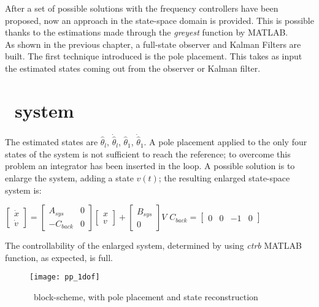 
After a set of possible solutions with the frequency controllers have been proposed, now an approach in the state-space domain is provided. This is possible thanks to the estimations made through the \textit{greyest} function by MATLAB.\\
As shown in the previous chapter, a full-state observer and Kalman Filters are built. The first technique introduced is the pole placement. This takes as input the estimated states coming out from the observer or Kalman filter.

\section{\onedof\ system}
The estimated states are $\hat\theta_l$, $\dot{\hat\theta}_l$, $\hat\theta_1$, $\dot{\hat\theta}_1$. 
A pole placement applied to the only four states of the system is not sufficient to reach the reference; to overcome this problem an integrator has been inserted in the loop. A possible solution is to enlarge the system, adding a state $v(t)$; the resulting enlarged state-space system is:
\begin{center}
	$\begin{bmatrix}
		\dot{x} \\
		\dot{v}
	\end{bmatrix}
	=
	\begin{bmatrix}
		A_{sys} & 0 \\
		-C_{back} & 0
	\end{bmatrix}
	\begin{bmatrix}
		x \\
		v
	\end{bmatrix}
	+
	\begin{bmatrix}
		B_{sys} \\
		0
	\end{bmatrix}
	V$		\qquad $ C_{back} =
	\begin{bmatrix}
		0 & 0 & -1 & 0
	\end{bmatrix}$
\end{center}

The controllability of the enlarged system, determined by using \textit{ctrb} MATLAB function, as expected, is full.
\begin{figure*}[h]
	\centering
	\texttt{[image: pp\_1dof]}
	\caption{\onedof\ block-scheme, with pole placement and state reconstruction}
	\label{fig:1_dof block scheme pp + obs}
\end{figure*}

